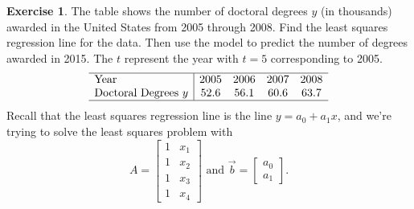 \documentclass{beamer}
\newcommand{\fn}{\insertframenumber}
\theoremstyle{definition}
\newtheorem{exercise}{Exercise}
\begin{document}
\begin{frame}{\fn}
	\begin{exercise}
		The table shows the number of doctoral degrees $y$ (in thousands) awarded in the United States from 2005 through 2008.  Find the least squares regression line for the data.  Then use the model to predict the number of degrees awarded in 2015.  The $t$ represent the year with $t=5$ corresponding to 2005.
			$$\begin{array}{l|cccc}
			\hline
			\text{Year}&2005&2006&2007&2008\\
			\text{Doctoral Degrees }y&52.6&56.1&60.6&63.7\\
			\hline
			\end{array}$$
		Recall that the least squares regression line is the line $y=a_0+a_1 x$, and we're trying to solve the least squares problem with
			\[A=\begin{bmatrix}1&x_1\\1&x_2\\1&x_3\\1&x_4\end{bmatrix}\text{ and }\vec b=\begin{bmatrix}a_0\\a_1\end{bmatrix}.\]
	\end{exercise}
\end{frame}
\end{document}

